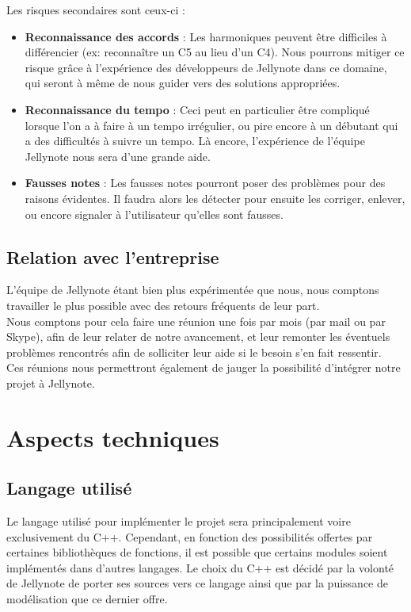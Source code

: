 \documentclass[12pt]{article}
\begin{document}
Les risques secondaires sont ceux-ci :
\begin{itemize}
\item \textbf{Reconnaissance des accords} : Les harmoniques peuvent être difficiles à différencier (ex: reconnaître un C5 au lieu d’un C4). Nous pourrons mitiger ce risque grâce à l’expérience des développeurs de Jellynote dans ce domaine, qui seront à même de nous guider vers des solutions appropriées.
\item \textbf{Reconnaissance du tempo} : Ceci peut en particulier être compliqué lorsque l’on a à faire à un tempo irrégulier, ou pire encore à un débutant qui a des difficultés à suivre un tempo. Là encore, l’expérience de l’équipe Jellynote nous sera d’une grande aide.
\item \textbf{Fausses notes} : Les fausses notes pourront poser des problèmes pour des raisons évidentes. Il faudra alors les détecter pour ensuite les corriger, enlever, ou encore signaler à l’utilisateur qu’elles sont fausses.
\end{itemize}

\subsection{Relation avec l'entreprise}

L’équipe de Jellynote étant bien plus expérimentée que nous, nous comptons travailler le plus possible avec des retours fréquents de leur part.\\

Nous comptons pour cela faire une réunion une fois par mois (par mail ou par Skype), afin de leur relater de notre avancement, et leur remonter les éventuels problèmes rencontrés afin de solliciter leur aide si le besoin s’en fait ressentir.\\

Ces réunions nous permettront également de jauger la possibilité d’intégrer notre projet à Jellynote.

\newpage
\section{Aspects techniques}
\subsection{Langage utilisé}

Le langage utilisé pour implémenter le projet sera principalement voire exclusivement du C++. Cependant, en fonction des possibilités offertes par certaines bibliothèques de fonctions, il est possible que certains modules soient implémentés dans d’autres langages. Le choix du C++ est décidé par la volonté de Jellynote de porter ses sources vers ce langage ainsi que par la puissance de modélisation que ce dernier offre.\\
\end{document}
